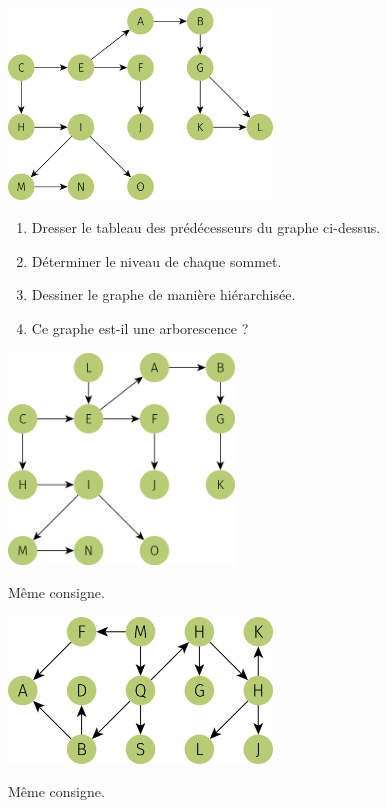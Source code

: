 \begin{exercice}[]
    \begin{center}
        \includegraphics[width=7cm]{graphes2/img/exo_niveau_1.png}
    \end{center}
    \begin{enumerate}
        \item 	Dresser le tableau des prédécesseurs du graphe ci-dessus.
        \item 	Déterminer le niveau de chaque sommet.
        \item 	Dessiner le graphe de manière hiérarchisée.
        \item 	Ce graphe est-il une arborescence ?
    \end{enumerate}
\end{exercice}

\begin{exercice}[]
    \begin{center}
        \includegraphics[width=6cm]{graphes2/img/exo_niveau_2.png}
    \end{center}
    Même consigne.
\end{exercice}

\begin{exercice}[]
    \begin{center}
        \includegraphics[width=7cm]{graphes2/img/exo_niveau_3.png}
    \end{center}
    Même consigne.
\end{exercice}
